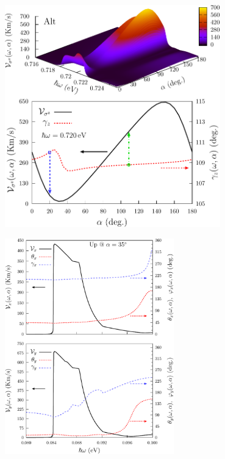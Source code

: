 \documentclass{beamer}
\begin{document}

\begin{frame}

\begin{center}
\includegraphics[width=0.7\textwidth]{figs/fig6.pdf}
\end{center}  

\end{frame}



\begin{frame}

\begin{center}
\includegraphics[width=0.55\textwidth]{figs/fig7.pdf}
\end{center}  

\end{frame}
\end{document}
